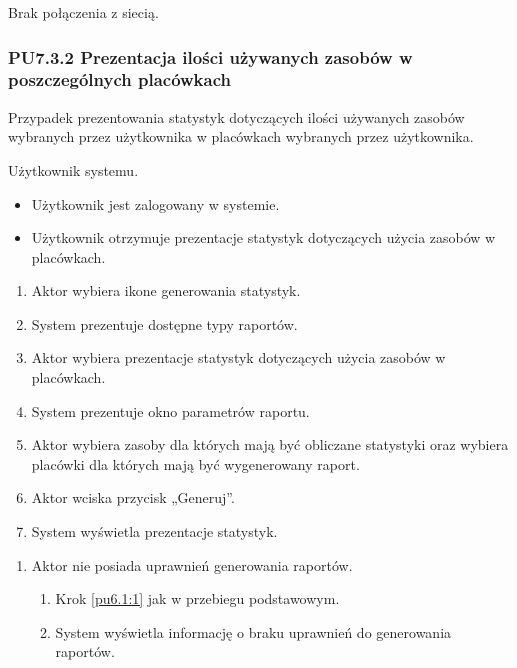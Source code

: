 Brak połączenia z siecią.

\subsubsection{PU7.3.2 Prezentacja ilości używanych zasobów w poszczególnych placówkach}
Przypadek prezentowania statystyk dotyczących ilości używanych zasobów wybranych przez użytkownika w placówkach wybranych przez użytkownika.

Użytkownik systemu.

\begin{itemize}
\item Użytkownik jest zalogowany w systemie.
\end{itemize}

\begin{itemize}
\item Użytkownik otrzymuje prezentacje statystyk dotyczących użycia zasobów w placówkach.
\end{itemize}

\begin{enumerate}
	\item \label{pu7.3.2:1} Aktor wybiera ikone generowania statystyk.
	\item System prezentuje dostępne typy raportów.
	\item \label{pu7.3.2:2} Aktor wybiera prezentacje statystyk dotyczących użycia zasobów w placówkach.
	\item System prezentuje okno parametrów raportu.
	\item Aktor wybiera zasoby dla których mają być obliczane statystyki oraz wybiera placówki dla których mają być wygenerowany raport.
	\item Aktor wciska przycisk „Generuj”.
	\item System wyświetla prezentacje statystyk.
\end{enumerate}

\begin{enumerate}
	\item Aktor nie posiada uprawnień generowania raportów.
	\begin{enumerate}[label*=\arabic*.]
		\item Krok \ref{pu6.1:1} jak w przebiegu podstawowym.
		\item System wyświetla informację o braku uprawnień do generowania raportów.
	\end{enumerate}
\end{enumerate}

